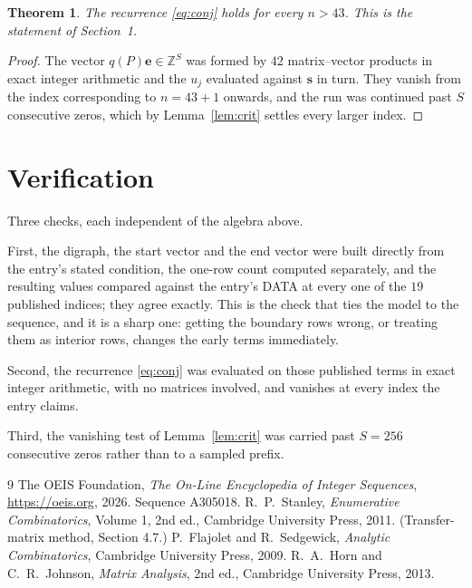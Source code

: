 \documentclass[11pt,a4paper]{article}
\theoremstyle{plain}
\newtheorem{theorem}{Theorem}
\theoremstyle{definition}
\begin{document}
\begin{theorem}
The recurrence \eqref{eq:conj} holds for every $n>43$. This is the statement of
Section~1.
\end{theorem}

\begin{proof}
The vector $q(P)\mathbf{e}\in\mathbb{Z}^{S}$ was formed by $42$ matrix--vector
products in exact integer arithmetic and the $u_j$ evaluated against $\mathbf{s}$ in turn.
They vanish from the index corresponding to $n=43+1$ onwards, and the run was continued
past $S$ consecutive zeros, which by Lemma~\ref{lem:crit} settles every larger index.
\end{proof}

\section{Verification}

Three checks, each independent of the algebra above.

First, the digraph, the start vector and the end vector were built directly from the
entry's stated condition, the one-row count computed separately, and the resulting values
compared against the entry's DATA at every one of the $19$ published indices; they
agree exactly. This is the check that ties the model to the sequence, and it is a sharp one:
getting the boundary rows wrong, or treating them as interior rows, changes the early terms
immediately.

Second, the recurrence \eqref{eq:conj} was evaluated on those published terms in exact
integer arithmetic, with no matrices involved, and vanishes at every index the entry claims.

Third, the vanishing test of Lemma~\ref{lem:crit} was carried past $S=256$ consecutive
zeros rather than to a sampled prefix.

\begin{thebibliography}{9}
 The OEIS Foundation, \emph{The On-Line Encyclopedia of Integer
Sequences}, \url{https://oeis.org}, 2026. Sequence A305018.
 R.~P.~Stanley, \emph{Enumerative Combinatorics}, Volume 1, 2nd ed.,
Cambridge University Press, 2011. (Transfer-matrix method, Section 4.7.)
 P.~Flajolet and R.~Sedgewick, \emph{Analytic Combinatorics}, Cambridge
University Press, 2009.
 R.~A.~Horn and C.~R.~Johnson, \emph{Matrix Analysis}, 2nd ed., Cambridge
University Press, 2013.
\end{thebibliography}
\end{document}
